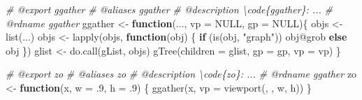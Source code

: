 \documentclass[
]{article}
\newenvironment{Shaded}{\begin{snugshade}}{\end{snugshade}}
\newcommand{\AttributeTok}[1]{\textcolor[rgb]{0.77,0.63,0.00}{#1}}
\newcommand{\CommentTok}[1]{\textcolor[rgb]{0.56,0.35,0.01}{\textit{#1}}}
\newcommand{\ConstantTok}[1]{\textcolor[rgb]{0.00,0.00,0.00}{#1}}
\newcommand{\ControlFlowTok}[1]{\textcolor[rgb]{0.13,0.29,0.53}{\textbf{#1}}}
\newcommand{\DecValTok}[1]{\textcolor[rgb]{0.00,0.00,0.81}{#1}}
\newcommand{\FunctionTok}[1]{\textcolor[rgb]{0.00,0.00,0.00}{#1}}
\newcommand{\NormalTok}[1]{#1}
\newcommand{\OtherTok}[1]{\textcolor[rgb]{0.56,0.35,0.01}{#1}}
\newcommand{\SpecialCharTok}[1]{\textcolor[rgb]{0.00,0.00,0.00}{#1}}
\newcommand{\StringTok}[1]{\textcolor[rgb]{0.31,0.60,0.02}{#1}}
\begin{document}
\begin{Shaded}
\begin{Highlighting}[]
\CommentTok{\#\textquotesingle{} @export ggather}
\CommentTok{\#\textquotesingle{} @aliases ggather}
\CommentTok{\#\textquotesingle{} @description \textbackslash{}code\{ggather\}: ...}
\CommentTok{\#\textquotesingle{} @rdname ggather}
\NormalTok{ggather }\OtherTok{\textless{}{-}} \ControlFlowTok{function}\NormalTok{(..., }\AttributeTok{vp =} \ConstantTok{NULL}\NormalTok{, }\AttributeTok{gp =} \ConstantTok{NULL}\NormalTok{)\{}
\NormalTok{  objs }\OtherTok{\textless{}{-}} \FunctionTok{list}\NormalTok{(...)}
\NormalTok{  objs }\OtherTok{\textless{}{-}} \FunctionTok{lapply}\NormalTok{(objs, }\ControlFlowTok{function}\NormalTok{(obj) \{}
    \ControlFlowTok{if}\NormalTok{ (}\FunctionTok{is}\NormalTok{(obj, }\StringTok{"graph"}\NormalTok{))}
\NormalTok{      obj}\SpecialCharTok{@}\NormalTok{grob}
    \ControlFlowTok{else}
\NormalTok{      obj}
\NormalTok{    \})}
\NormalTok{  glist }\OtherTok{\textless{}{-}} \FunctionTok{do.call}\NormalTok{(gList, objs)}
  \FunctionTok{gTree}\NormalTok{(}\AttributeTok{children =}\NormalTok{ glist, }\AttributeTok{gp =}\NormalTok{ gp, }\AttributeTok{vp =}\NormalTok{ vp)}
\NormalTok{\}}

\CommentTok{\#\textquotesingle{} @export zo}
\CommentTok{\#\textquotesingle{} @aliases zo}
\CommentTok{\#\textquotesingle{} @description \textbackslash{}code\{zo\}: ...}
\CommentTok{\#\textquotesingle{} @rdname ggather}
\NormalTok{zo }\OtherTok{\textless{}{-}} \ControlFlowTok{function}\NormalTok{(x, }\AttributeTok{w =}\NormalTok{ .}\DecValTok{9}\NormalTok{, }\AttributeTok{h =}\NormalTok{ .}\DecValTok{9}\NormalTok{) \{}
  \FunctionTok{ggather}\NormalTok{(x, }\AttributeTok{vp =} \FunctionTok{viewport}\NormalTok{(, , w, h))}
\NormalTok{\}}
\end{Highlighting}
\end{Shaded}
\end{document}
